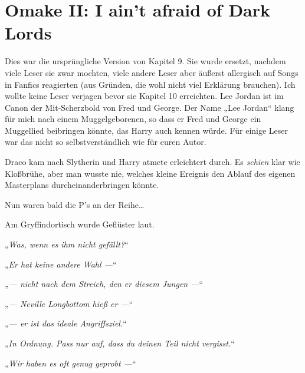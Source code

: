 


\section{Omake II: I ain't afraid of Dark Lords}

Dies war die ursprüngliche Version von Kapitel 9. Sie wurde ersetzt, nachdem viele Leser sie zwar mochten, viele andere Leser aber äußerst allergisch auf Songs in Fanfics reagierten (aus Gründen, die wohl nicht viel Erklärung brauchen). Ich wollte keine Leser verjagen bevor sie Kapitel 10 erreichten.
Lee Jordan ist im Canon der Mit-Scherzbold von Fred und George. Der Name „Lee Jordan“ klang für mich nach einem Muggelgeborenen, so dass er Fred und George ein Muggellied beibringen könnte, das Harry auch kennen würde. Für einige Leser war das nicht so selbstverständlich wie für euren Autor.

\later

Draco kam nach Slytherin und Harry atmete erleichtert durch. Es \emph{schien} klar wie Kloßbrühe, aber man wusste nie, welches kleine Ereignis den Ablauf des eigenen Masterplans durcheinanderbringen könnte.

Nun waren bald die P’s an der Reihe…

Am Gryffindortisch wurde Geflüster laut.

„\emph{Was, wenn es ihm nicht gefällt?}“

„\emph{Er hat keine andere Wahl —}“

„\emph{— nicht nach dem Streich, den er diesem Jungen —}“

„\emph{— Neville Longbottom hieß er —}“

„\emph{— er ist das ideale Angriffsziel.}“

„\emph{In Ordnung. Pass nur auf, dass du deinen Teil nicht vergisst.}“

„\emph{Wir haben es oft genug geprobt —}“

